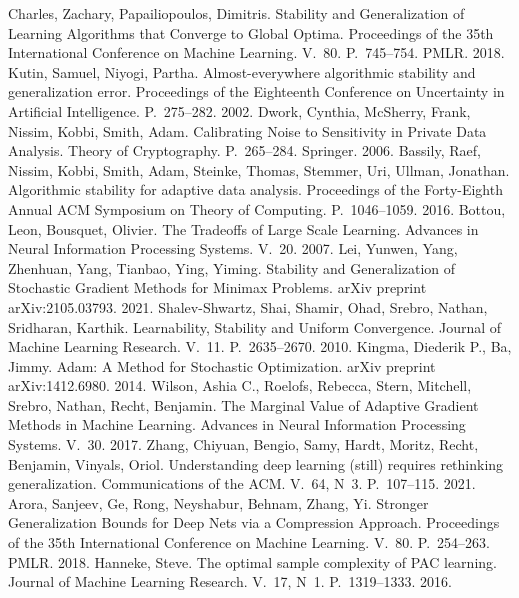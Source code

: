  Charles, Zachary, Papailiopoulos, Dimitris. Stability and Generalization of Learning Algorithms that Converge to Global Optima. Proceedings of the 35th International Conference on Machine Learning. V.~80. P.~745--754. PMLR. 2018.
 Kutin, Samuel, Niyogi, Partha. Almost-everywhere algorithmic stability and generalization error. Proceedings of the Eighteenth Conference on Uncertainty in Artificial Intelligence. P.~275--282. 2002.
 Dwork, Cynthia, McSherry, Frank, Nissim, Kobbi, Smith, Adam. Calibrating Noise to Sensitivity in Private Data Analysis. Theory of Cryptography. P.~265--284. Springer. 2006.
 Bassily, Raef, Nissim, Kobbi, Smith, Adam, Steinke, Thomas, Stemmer, Uri, Ullman, Jonathan. Algorithmic stability for adaptive data analysis. Proceedings of the Forty-Eighth Annual ACM Symposium on Theory of Computing. P.~1046--1059. 2016.
 Bottou, Leon, Bousquet, Olivier. The Tradeoffs of Large Scale Learning. Advances in Neural Information Processing Systems. V.~20. 2007.
 Lei, Yunwen, Yang, Zhenhuan, Yang, Tianbao, Ying, Yiming. Stability and Generalization of Stochastic Gradient Methods for Minimax Problems. arXiv preprint arXiv:2105.03793. 2021.
 Shalev-Shwartz, Shai, Shamir, Ohad, Srebro, Nathan, Sridharan, Karthik. Learnability, Stability and Uniform Convergence. Journal of Machine Learning Research. V.~11. P.~2635--2670. 2010.
 Kingma, Diederik P., Ba, Jimmy. Adam: A Method for Stochastic Optimization. arXiv preprint arXiv:1412.6980. 2014.
 Wilson, Ashia C., Roelofs, Rebecca, Stern, Mitchell, Srebro, Nathan, Recht, Benjamin. The Marginal Value of Adaptive Gradient Methods in Machine Learning. Advances in Neural Information Processing Systems. V.~30. 2017.
 Zhang, Chiyuan, Bengio, Samy, Hardt, Moritz, Recht, Benjamin, Vinyals, Oriol. Understanding deep learning (still) requires rethinking generalization. Communications of the ACM. V.~64, N~3. P.~107--115. 2021.
 Arora, Sanjeev, Ge, Rong, Neyshabur, Behnam, Zhang, Yi. Stronger Generalization Bounds for Deep Nets via a Compression Approach. Proceedings of the 35th International Conference on Machine Learning. V.~80. P.~254--263. PMLR. 2018.
 Hanneke, Steve. The optimal sample complexity of PAC learning. Journal of Machine Learning Research. V.~17, N~1. P.~1319--1333. 2016.
